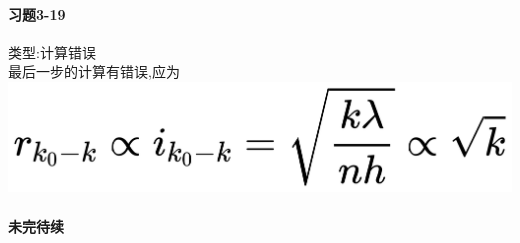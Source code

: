 \documentclass[a4paper,11pt]{ctexart}
\newtheorem{thm}{定理}[section]
\begin{document}
\paragraph{习题3-19}类型:计算错误\\
最后一步的计算有错误,应为\\
\includegraphics[scale = 0.04]{2.jpg}

\paragraph{未完待续}

\end{document}
